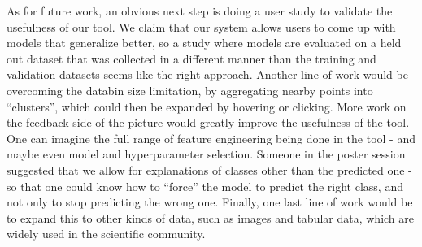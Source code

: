 \documentclass{chi2009}
\begin{document}
As for future work, an obvious next step is doing a user study to validate the
usefulness of our tool. We claim that our system allows users to come up with
models that generalize better, so a study where models are evaluated on a held
out dataset that was collected in a different manner than the training and
validation datasets seems like the right approach. Another line of work would be
overcoming the databin size limitation, by aggregating nearby points into
``clusters'', which could then be expanded by hovering or clicking. More work on
the feedback side of the picture would greatly improve the usefulness of the
tool. One can imagine the full range of feature engineering being done in the
tool - and maybe even model and hyperparameter selection. Someone in the poster
session suggested that we allow for explanations of classes other than the
predicted one - so that one could know how to ``force'' the model to predict the
right class, and not only to stop predicting the wrong one. Finally, one last
line of work would be to expand this to other kinds of data, such as images and
tabular data, which are widely used in the scientific community.




\end{document}
